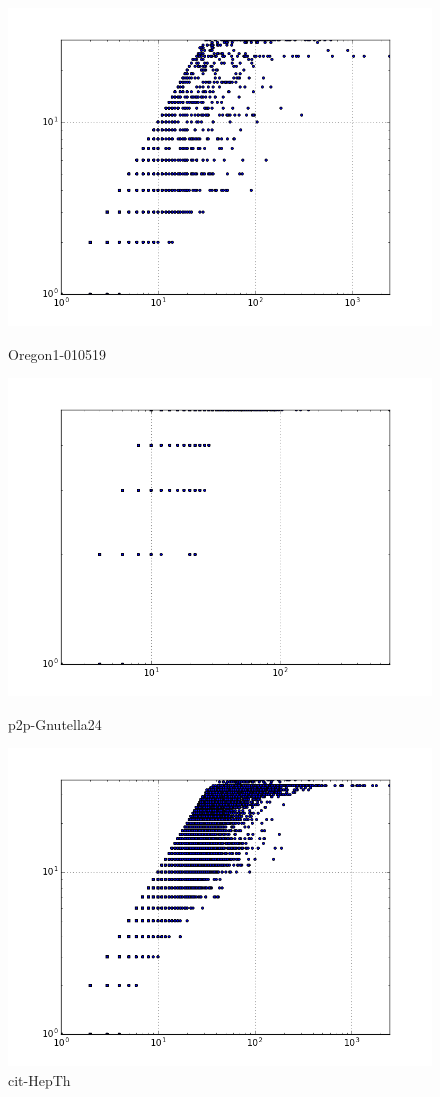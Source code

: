 \begin{figure}[H]
  \includegraphics[width=\linewidth]{img/oregon-010519/degreeVSkcore.png}
  \caption*{Oregon1-010519}
\endminipage\hfill
{}
  \includegraphics[width=\linewidth]{img/p2p-Gnutella24/degreeVSkcore.png}
  \caption*{p2p-Gnutella24}
\endminipage\hfill
{}
  \includegraphics[width=\linewidth]{img/cit-HepTh/degreeVSkcore.png}
  \caption*{cit-HepTh}
\endminipage
\end{figure}

